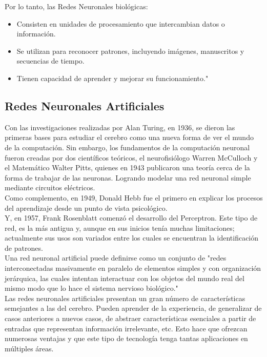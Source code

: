 \documentclass[conference]{IEEEtran}
\begin{document}
Por lo tanto, las Redes Neuronales biológicas:

\begin{itemize}
	\item Consisten en unidades de procesamiento que intercambian datos o información.
	\item Se utilizan para reconocer patrones, incluyendo imágenes, manuscritos y secuencias de tiempo.
	\item Tienen capacidad de aprender y mejorar su funcionamiento." \cite{walter}
\end{itemize}

\subsection{Redes Neuronales Artificiales}
Con las investigaciones realizadas por Alan Turing, en 1936, se dieron las primeras bases para estudiar el cerebro como una nueva forma de ver el mundo de la computación. Sin embargo, los fundamentos de la computación neuronal fueron creadas por dos científicos teóricos, el neurofisiólogo Warren McCulloch y el Matemático Walter Pitts, quienes en 1943 publicaron una teoría cerca de la forma de trabajar de las neuronas. Logrando modelar una red neuronal simple mediante circuitos eléctricos.\\
Como complemento, en 1949, Donald Hebb fue el primero en explicar los procesos del aprendizaje desde un punto de vista psicológico.\\
Y, en 1957, Frank Rosenblatt comenzó el desarrollo del Perceptron. Este tipo de red, es la más antigua y, aunque en sus inicios tenía muchas limitaciones; actualmente sus usos son variados entre los cuales se encuentran la identificación de patrones.\\

Una red neuronal artificial puede definirse como un conjunto de "redes interconectadas masivamente en paralelo de elementos simples y con organización jerárquica, las cuales intentan interactuar con los objetos del mundo real del mismo modo que lo hace el sistema nervioso biológico." \cite{walter} \\
Las redes neuronales artificiales presentan un gran número de características semejantes a las del cerebro. Pueden aprender de la experiencia, de generalizar de casos anteriores a nuevos casos, de abstraer características esenciales a partir de entradas que representan información irrelevante, etc. Esto hace que ofrezcan numerosas ventajas y que este tipo de tecnología tenga tantas aplicaciones en múltiples áreas.\\
\end{document}
